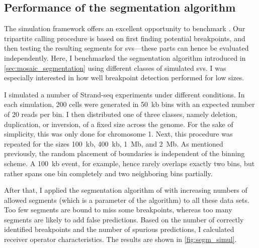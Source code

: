 \subsection{Performance of the segmentation algorithm}
\label{sec:mosaic_segm_simul}

The simulation framework offers an excellent opportunity to benchmark \mc. Our
tripartite calling procedure is based on first finding potential breakpoints,
and then testing the resulting segments for \acp{sv}---these parts can hence be
evaluated independently. Here, I benchmarked the segmentation algorithm
introduced in \cref{sec:mosaic_segmentation} using different classes of
simulated \acp{sv}. I was especially interested in how well breakpoint detection
performed for low \sv sizes.

I simulated a number of Strand-seq experiments under different conditions. In
each simulation, 200 cells were generated in 50~kb bins with an expected number
of 20 reads per bin. I then distributed one of three \sv classes, namely
deletion, duplication, or inversion, of a fixed size across the genome. For the
sake of simplicity, this was only done for chromosome 1. Next, this procedure
was repeated for the \sv sizes 100~kb, 400~kb, 1~Mb, and 2~Mb. As mentioned
previously, the random placement of \sv boundaries is independent of the binning
scheme. A 100~kb event, for example, hence rarely overlaps exactly two bins, but
rather spans one bin completely and two neighboring bins partially.

After that, I applied the segmentation algorithm of \mc with
increasing numbers of allowed segments (which is a parameter
of the algorithm) to all these data sets. Too few segments
are bound to miss some \sv breakpoints, whereas too many segments are likely to add false
predictions. Based on the number of correctly identified breakpoints and the
number of spurious predictions, I calculated receiver operator characteristics.
The results are shown in \cref{fig:segm_simul}.


